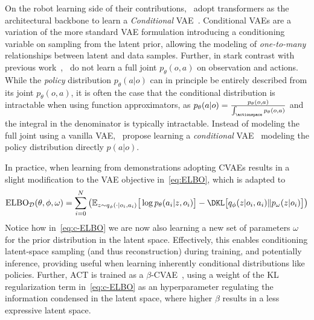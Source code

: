 On the robot learning side of their contributions,~\citet{zhaoLearningFineGrainedBimanual2023} adopt transformers as the architectural backbone to learn a \emph{Conditional} VAE~\citep{sohnLearningStructuredOutput2015}. 
Conditional VAEs are a variation of the more standard VAE formulation introducing a conditioning variable on sampling from the latent prior, allowing the modeling of \emph{one-to-many} relationships between latent and data samples.
Further, in stark contrast with previous work~\citep{florenceImplicitBehavioralCloning2022,jannerPlanningDiffusionFlexible2022},~\citet{zhaoLearningFineGrainedBimanual2023} do not learn a full joint \( p_\theta(o,a) \) on observation and actions.
While the \emph{policy} distribution \( p_\theta(a \vert o) \) can in principle be entirely described from its joint \( p_\theta(o,a) \), it is often the case that the conditional distribution is intractable when using function approximators, as \( p_\theta(a \vert o) = \tfrac{p_\theta(o,a)}{\int_\actionspace p_\theta(o,a)} \) and the integral in the denominator is typically intractable.
Instead of modeling the full joint using a vanilla VAE,~\citet{zhaoLearningFineGrainedBimanual2023} propose learning a \emph{conditional} VAE~\citep{sohnLearningStructuredOutput2015} modeling the policy distribution directly \( p (a \vert o) \).

In practice, when learning from demonstrations adopting CVAEs results in a slight modification to the VAE objective in~\ref{eq:ELBO}, which is adapted to
\begin{align}\label{eq:c-ELBO}
    \text{ELBO}_{\mathcal D}(\theta, \phi, \omega) = \sum_{i=0}^{N} \left(
            \mathbb{E}_{z \sim q_\phi(\cdot \vert o_i, a_i)} \big[ \log p_\theta(a_i \vert z, o_i) \big]
        - \DKL \big[ q_\phi(z \vert o_i, a_i) \Vert p_\omega(z \vert o_i) \big]
        \right)
\end{align}
Notice how in~\ref{eq:c-ELBO} we are now also learning a new set of parameters \( \omega \) for the prior distribution in the latent space.
Effectively, this enables conditioning latent-space sampling (and thus reconstruction) during training, and potentially inference, providing useful when learning inherently conditional distributions like policies.
Further, ACT is trained as a \( \beta\)-CVAE~\citep{higgins2017beta}, using a weight of the KL regularization term in~\ref{eq:c-ELBO} as an hyperparameter regulating the information condensed in the latent space, where higher \( \beta \) results in a less expressive latent space.


